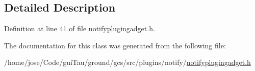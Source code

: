 \subsection{Detailed Description}


Definition at line 41 of file notifyplugingadget.\-h.



The documentation for this class was generated from the following file\-:\begin{DoxyCompactItemize}
\item 
/home/jose/\-Code/gui\-Tau/ground/gcs/src/plugins/notify/\hyperlink{notifyplugingadget_8h}{notifyplugingadget.\-h}\end{DoxyCompactItemize}
